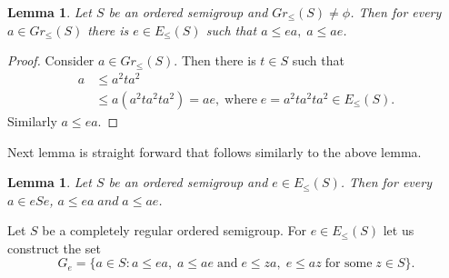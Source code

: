 \documentclass[13pt]{article}
\newtheorem{Lemma}[theorem]{Lemma}
\theoremstyle{definition}
\theoremstyle{remark}
\numberwithin{equation}{section}
\begin{document}
\begin{Lemma}\label{cr0.1}
Let $S$ be an  ordered semigroup and $Gr_\leq(S)\neq \phi$. Then for
every $a \in Gr_\leq (S)$ there is $e \in E_\leq(S)$ such that $a
\leq ea, \;a \leq ae$.
\end{Lemma}
\begin{proof}
Consider $a \in Gr_\leq (S)$. Then there is $t\in S$ such that
\begin{align*}
a &\leq a^2 ta^2\\
  & \leq a(a^2 ta^2 ta^2)= ae, \;\textrm{where} \;e= a^2 ta^2
ta^2 \in E_\leq(S).
\end{align*}
 Similarly $a \leq ea$.
\end{proof}

Next lemma is  straight forward that follows similarly to the above
lemma.

\begin{Lemma}\label{cr0.3}
 Let $S$ be an  ordered semigroup and $e \in E_\leq(S)$. Then
for every $a \in eSe$,  $a \leq ea \;and \;a \leq ae$.
\end{Lemma}

Let $S$ be a completely regular ordered semigroup. For  $e \in
E_\leq(S)$ let us construct the set $$G_e= \{a \in S: a \leq ea, \;a
\leq ae \;\textrm{and} \;e \leq za, \;e \leq az \;\textrm{for some}
\;z\in S\}.$$
\end{document}
